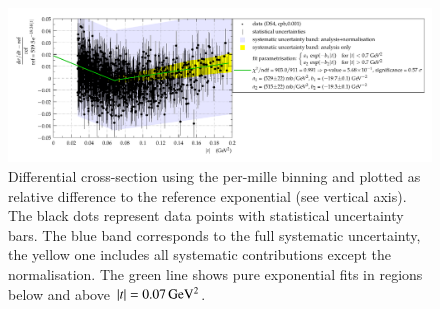 \begin{figure}
\begin{center}
\includegraphics[width=\textwidth]{fig/t_dist_rel_with_split_fit.pdf}
\vskip-6mm
\caption{
Differential cross-section using the per-mille binning and plotted as relative difference to the reference exponential (see vertical axis). The black dots represent data points with statistical uncertainty bars. The blue band corresponds to the full systematic uncertainty, the yellow one includes all systematic contributions except the normalisation. The green line shows pure exponential fits in regions below and above $|t| = 0.07\,{\rm GeV^2}$.
}
\label{fig:data rel cpb0.001}
\end{center}
\end{figure}



